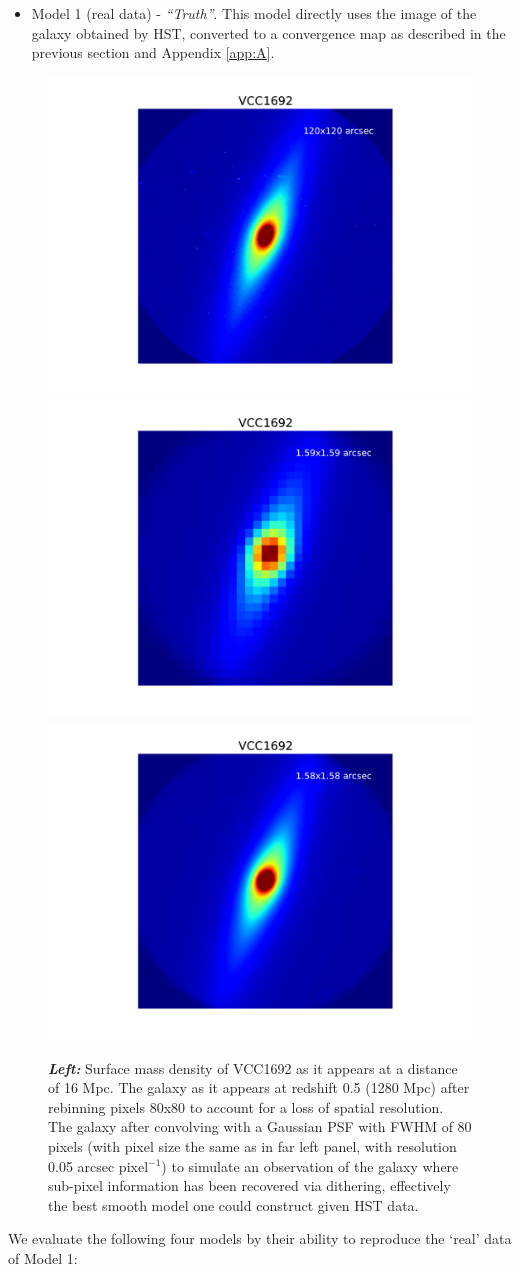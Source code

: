 \begin{itemize}
	\item Model 1 (real data) - \textit{``Truth''}. This model directly uses the image of the galaxy obtained by HST, converted to a convergence map as described in the previous section and Appendix \ref{app:A}. 
\end{itemize}
\begin{figure}
	\centering
	\includegraphics[clip,trim=4.1cm 1.5cm 4.1cm 2cm,width=.325\textwidth]{./figures_sls/baryonmap_truth-eps-converted-to.pdf}
	\includegraphics[clip,trim=4.1cm 1.5cm 4.1cm 2cm,width=.325\textwidth]{./figures_sls/baryonmap_RealHST-eps-converted-to.pdf}
	\includegraphics[clip,trim=4.1cm 1.5cm 4.1cm 2cm,width=.325\textwidth]{./figures_sls/baryonmap_smoothed-eps-converted-to.pdf}
	\caption{\label{fig:VCC1692real_vs_mods}{\bf{\emph{Left:}}} Surface mass density of VCC1692 as it appears at a distance of 16 Mpc.  The galaxy as it appears at redshift 0.5 (1280 Mpc) after rebinning pixels 80x80 to account for a loss of spatial resolution.   The galaxy after convolving with a Gaussian PSF with FWHM of 80 pixels (with pixel size the same as in far left panel, with resolution 0.05 arcsec pixel$^{-1}$) to simulate an observation of the galaxy where sub-pixel information has been recovered via dithering, effectively the best smooth model one could construct given HST data.}
\end{figure}
\noindent We evaluate the following four models by their ability to reproduce the `real' data of Model 1:

